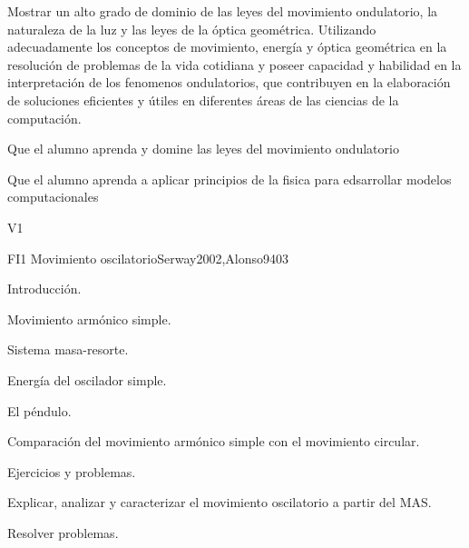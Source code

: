 \begin{syllabus}


\begin{justification}
Mostrar un alto grado de dominio de las leyes del movimiento ondulatorio,
la naturaleza de la luz y las leyes de la óptica geométrica.
Utilizando  adecuadamente los conceptos de movimiento, energía y óptica
geométrica en la resolución de problemas de la vida cotidiana y poseer
capacidad y habilidad en la interpretación de los fenomenos ondulatorios,
que contribuyen en la elaboración de soluciones eficientes y útiles en
diferentes áreas de las ciencias de la computación.
\end{justification}

\begin{goals}
\item Que el alumno aprenda y domine las leyes del movimiento ondulatorio
\item Que el alumno aprenda a aplicar principios de la fisica para edsarrollar modelos computacionales
\end{goals}

\begin{outcomes}{V1}
\end{outcomes}

\begin{unit}{FI1 Movimiento oscilatorio}{}{Serway2002,Alonso94}{0}{3}
\begin{topics}
      \item Introducción.
      \item Movimiento armónico simple.
      \item Sistema masa-resorte.
      \item Energía del oscilador simple.
      \item El péndulo.
      \item Comparación del movimiento armónico simple con el movimiento circular.
      \item Ejercicios y problemas.
   \end{topics}

   \begin{learningoutcomes}
      \item Explicar, analizar y caracterizar el movimiento oscilatorio a partir del MAS.
      \item Resolver problemas.
   \end{learningoutcomes}
\end{unit}


\end{syllabus}
